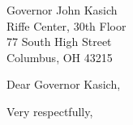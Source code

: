 \documentclass{letter}
\begin{document}
\begin{letter}{
  Governor John Kasich  \\
  Riffe Center, 30th Floor \\
  77 South High Street \\
  Columbus, OH 43215}

\opening{Dear Governor Kasich,}



\closing{Very respectfully,}


\end{letter}
\end{document}
